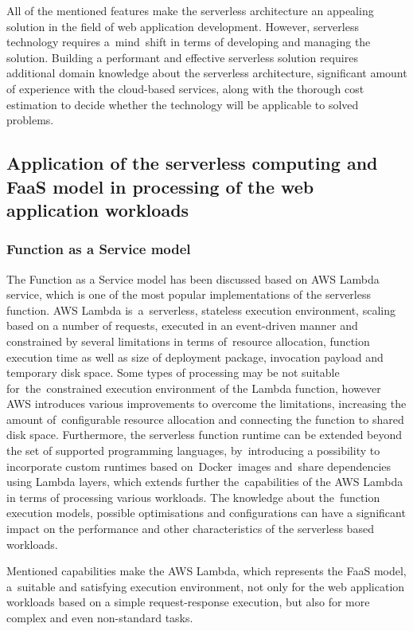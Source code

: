 All of the mentioned features make the serverless architecture an appealing solution in the field of web application development. However, serverless technology requires a~mind~shift in terms of developing and managing the solution.
Building a performant and effective serverless solution requires additional domain knowledge about the serverless architecture, significant amount of experience with the cloud-based services, along with the thorough cost estimation to decide whether the technology will be applicable to solved problems.

\subsection{Application of the serverless computing and FaaS model in processing of the web application workloads}

\subsubsection{Function as a Service model}

The Function as a Service model has been discussed based on AWS Lambda service, which is one of the most popular implementations of the serverless function. 
AWS Lambda is~a~serverless, stateless execution environment, scaling based on a number of requests, executed in an event-driven manner and constrained by several limitations in terms of~resource allocation, function execution time as well as size of deployment package, invocation payload and temporary disk space.
Some types of processing may be not suitable for~the~constrained execution environment of the Lambda function, however AWS introduces various improvements to overcome the limitations, increasing the amount of~configurable resource allocation and connecting the function to shared disk space.
Furthermore, the serverless function runtime can be extended beyond the set of supported programming languages, by~introducing a possibility to incorporate custom runtimes based on~Docker~images and~share dependencies using Lambda layers, which extends further the~capabilities of the AWS Lambda in terms of processing various workloads.
The knowledge about the~function execution models, possible optimisations and configurations can have a significant impact on the performance and other characteristics of the serverless based workloads.

Mentioned capabilities make the AWS Lambda, which represents the FaaS model, a~suitable and satisfying execution environment, not only for the web application workloads based on a simple request-response execution, but also for more complex and even non-standard tasks.

